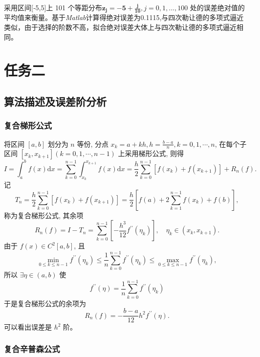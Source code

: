 \documentclass{ctexart}%
\begin{document}
采用区间[‐5,5]上 101 个等距分布$\mathbf{z_j=-5+\frac{j}{10}},j=0,1,...,100$
处的误差绝对值的平均值来衡量。基于\textit{Matlab}计算得绝对误差为0.1115,与四次勒让德的多项式逼近类似，由于选择的阶数不高，拟合绝对误差大体上与四次勒让德的多项式逼近相同。


\newpage
\section{任务二}

\subsection{算法描述及误差阶分析}
\hypertarget{wucha}{}
\subsubsection{复合梯形公式}
将区间 $[a, b]$ 划分为 $n$ 等份, 分点 $x_{k}=a+k h, h=\frac{b-a}{n}, k=0,1, \cdots, n$, 在每个子区间 $\left[x_{k}, x_{k+1}\right](k=0,1, \cdots, n-1)$ 上采用梯形公式, 则得
$$
I=\int_{a}^{b} f(x) \mathrm{d} x=\sum_{k=0}^{n-1} \int_{x_{k}}^{x_{k+1}} f(x) \mathrm{d} x=\frac{h}{2} \sum_{k=0}^{n-1}\left[f\left(x_{k}\right)+f\left(x_{k+1}\right)\right]+R_{n}(f) .
$$
记
$$
T_{n}=\frac{h}{2} \sum_{k=0}^{n-1}\left[f\left(x_{k}\right)+f\left(x_{k+1}\right)\right]=\frac{h}{2}\left[f(a)+2 \sum_{k=1}^{n-1} f\left(x_{k}\right)+f(b)\right],
$$
称为复合梯形公式, 其余项
$$
R_{n}(f)=I-T_{n}=\sum_{k=0}^{n-1}\left[-\frac{h^{3}}{12} f^{\prime \prime}\left(\eta_{k}\right)\right], \quad \eta_{k} \in\left(x_{k}, x_{k+1}\right) .
$$
由于 $f(x) \in C^{2}[a, b]$, 且
$$
\min _{0 \leqslant k \leqslant n-1} f^{\prime \prime}\left(\eta_{k}\right) \leqslant \frac{1}{n} \sum_{k=0}^{n-1} f^{\prime \prime}\left(\eta_{k}\right) \leqslant \max _{0 \leqslant k \leqslant n-1} f^{\prime \prime}\left(\eta_{k}\right),
$$
所以 $\exists \eta \in(a, b)$ 使$$
f^{\prime \prime}(\eta)=\frac{1}{n} \sum_{k=0}^{n-1} f^{\prime \prime}\left(\eta_{k}\right)
$$
于是复合梯形公式的余项为
$$
R_{n}(f)=-\frac{b-a}{12} h^{2} f^{\prime \prime}(\eta) .
$$
可以看出误差是 $h^{2}$ 阶。
\subsubsection{复合辛普森公式}
\end{document}
